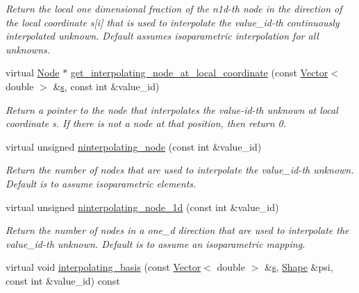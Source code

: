 \begin{DoxyCompactItemize}
\begin{DoxyCompactList}\small\item\em Return the local one dimensional fraction of the n1d-\/th node in the direction of the local coordinate s\mbox{[}i\mbox{]} that is used to interpolate the value\+\_\+id-\/th continuously interpolated unknown. Default assumes isoparametric interpolation for all unknowns. \end{DoxyCompactList}\item 
virtual \hyperlink{classoomph_1_1Node}{Node} $\ast$ \hyperlink{classoomph_1_1RefineableElement_ad920e66c00888c450f926f08c7793f78}{get\+\_\+interpolating\+\_\+node\+\_\+at\+\_\+local\+\_\+coordinate} (const \hyperlink{classoomph_1_1Vector}{Vector}$<$ double $>$ \&\hyperlink{cfortran_8h_ab7123126e4885ef647dd9c6e3807a21c}{s}, const int \&value\+\_\+id)
\begin{DoxyCompactList}\small\item\em Return a pointer to the node that interpolates the value-\/id-\/th unknown at local coordinate s. If there is not a node at that position, then return 0. \end{DoxyCompactList}\item 
virtual unsigned \hyperlink{classoomph_1_1RefineableElement_a8b1b5031b55141567ba24913a21534f4}{ninterpolating\+\_\+node} (const int \&value\+\_\+id)
\begin{DoxyCompactList}\small\item\em Return the number of nodes that are used to interpolate the value\+\_\+id-\/th unknown. Default is to assume isoparametric elements. \end{DoxyCompactList}\item 
virtual unsigned \hyperlink{classoomph_1_1RefineableElement_a850180084aaf164550b4f4978b42cda7}{ninterpolating\+\_\+node\+\_\+1d} (const int \&value\+\_\+id)
\begin{DoxyCompactList}\small\item\em Return the number of nodes in a one\+\_\+d direction that are used to interpolate the value\+\_\+id-\/th unknown. Default is to assume an isoparametric mapping. \end{DoxyCompactList}\item 
virtual void \hyperlink{classoomph_1_1RefineableElement_a8ca420443c28708e5c6315a80f520137}{interpolating\+\_\+basis} (const \hyperlink{classoomph_1_1Vector}{Vector}$<$ double $>$ \&\hyperlink{cfortran_8h_ab7123126e4885ef647dd9c6e3807a21c}{s}, \hyperlink{classoomph_1_1Shape}{Shape} \&psi, const int \&value\+\_\+id) const

\end{DoxyCompactItemize}
